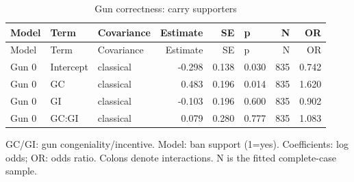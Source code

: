 
\begin{longtable}[t]{lllrrlrr}
\caption{\label{tab:logit1}Gun correctness: carry supporters}\\
\toprule
Model & Term & Covariance & Estimate & SE & p & N & OR\\
\midrule
\endfirsthead
\toprule
Model & Term & Covariance & Estimate & SE & p & N & OR\\
\midrule
\endhead
Gun 0 & Intercept & classical & -0.298 & 0.138 & 0.030 & 835 & 0.742\\
Gun 0 & GC & classical & 0.483 & 0.196 & 0.014 & 835 & 1.620\\
Gun 0 & GI & classical & -0.103 & 0.196 & 0.600 & 835 & 0.902\\
Gun 0 & GC:GI & classical & 0.079 & 0.280 & 0.777 & 835 & 1.083\\
\bottomrule
\end{longtable}
\noindent\footnotesize GC/GI: gun congeniality/incentive. Model: ban support (1=yes). Coefficients: log odds; OR: odds ratio. Colons denote interactions. N is the fitted complete-case sample.\par\normalsize
